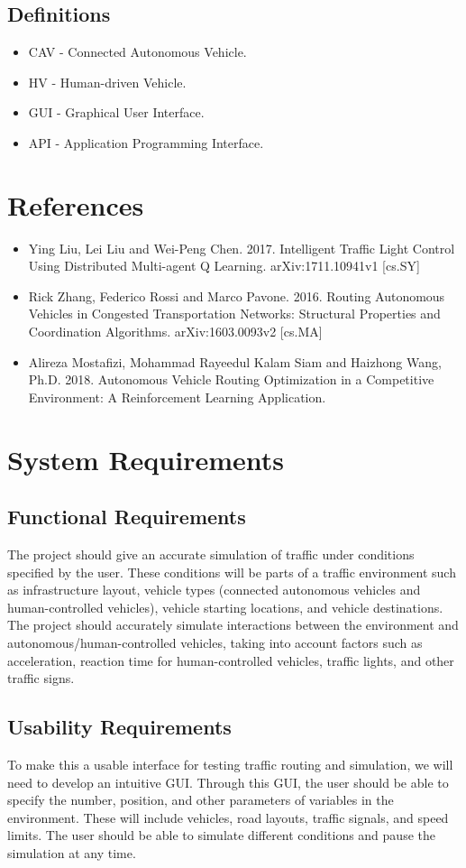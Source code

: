 \documentclass[onecolumn, draftclsnofoot,10pt, compsoc]{IEEEtran}
\begin{document}
\subsection{Definitions}
\begin{itemize}
\item CAV - Connected Autonomous Vehicle.
\item HV - Human-driven Vehicle.
\item GUI - Graphical User Interface.
\item API - Application Programming Interface.
\end{itemize}
\section{References}
\begin{itemize}
\item Ying Liu, Lei Liu and Wei-Peng Chen. 2017. Intelligent Traffic Light Control Using Distributed Multi-agent Q Learning. arXiv:1711.10941v1 [cs.SY]
\item Rick Zhang, Federico Rossi and Marco Pavone. 2016. Routing Autonomous Vehicles in Congested Transportation Networks: Structural Properties and Coordination Algorithms. arXiv:1603.0093v2 [cs.MA]
\item Alireza Mostafizi, Mohammad Rayeedul Kalam Siam and Haizhong Wang, Ph.D. 2018.  Autonomous Vehicle Routing Optimization in a Competitive Environment: A Reinforcement Learning Application.
\end{itemize}
\section{System Requirements}
\subsection{Functional Requirements}
The project should give an accurate simulation of traffic under conditions specified by the user.
These conditions will be parts of a traffic environment such as infrastructure layout, vehicle types (connected autonomous vehicles and human-controlled vehicles), vehicle starting locations, and vehicle destinations.
The project should accurately simulate interactions between the environment and autonomous/human-controlled vehicles, taking into account factors such as acceleration, reaction time for human-controlled vehicles, traffic lights, and other traffic signs.
\subsection{Usability Requirements}
To make this a usable interface for testing traffic routing and simulation, we will need to develop an intuitive GUI.
Through this GUI, the user should be able to specify the number, position, and other parameters of variables in the environment.
These will include vehicles, road layouts, traffic signals, and speed limits.
The user should be able to simulate different conditions and pause the simulation at any time.
\end{document}
